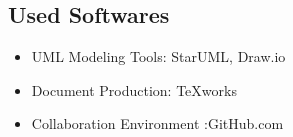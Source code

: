 \subsection{Used Softwares}
\begin{itemize}
\item UML Modeling Tools: StarUML, Draw.io
\item Document Production: TeXworks
\item Collaboration Environment :GitHub.com
\end{itemize}